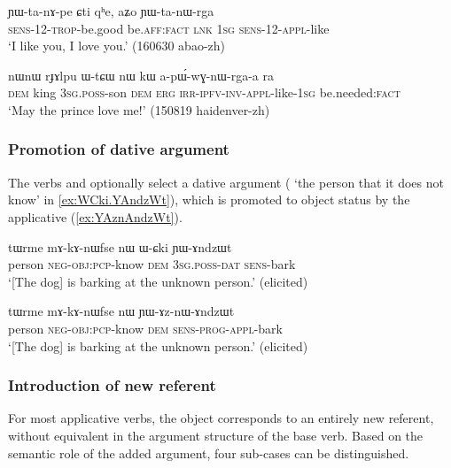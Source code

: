 \begin{exe}
\ex \label{ex:YWtanWrga}
\gll ɲɯ-ta-nɤ-pe ɕti qʰe, aʑo ɲɯ-ta-nɯ-rga \\
\textsc{sens}-1\fl{}2-\textsc{trop}-be.good be.\textsc{aff}:\textsc{fact} \textsc{lnk} \textsc{1sg} \textsc{sens}-1\fl{}2-\textsc{appl}-like \\
\glt `I like you, I love you.' (160630 abao-zh)
\end{exe}

\begin{exe}
\ex \label{ex:apWwGnWrgaa}
\gll nɯnɯ rɟɤlpu ɯ-tɕɯ nɯ kɯ a-pɯ́-wɣ-nɯ-rga-a ra \\
\textsc{dem} king \textsc{3sg}.\textsc{poss}-son \textsc{dem} \textsc{erg} \textsc{irr}-\textsc{ipfv}-\textsc{inv}-\textsc{appl}-like-\textsc{1sg} be.needed:\textsc{fact} \\
\glt `May the prince love me!' (150819 haidenver-zh)
\end{exe}

\subsubsection{Promotion of dative argument} \label{sec:applicative.dative}
The verbs  and  optionally select a dative argument ( `the person that it does not know' in \ref{ex:WCki.YAndzWt}), which is promoted to object status by the applicative (\ref{ex:YAznAndzWt}).

\begin{exe}
\ex \label{ex:WCki.YAndzWt}
\gll tɯrme mɤ-kɤ-nɯfse nɯ ɯ-ɕki ɲɯ-ɤndzɯt \\
person \textsc{neg}-\textsc{obj}:\textsc{pcp}-know \textsc{dem} \textsc{3sg}.\textsc{poss}-\textsc{dat} \textsc{sens}-bark \\
\glt `[The dog] is barking at the unknown person.' (elicited)
\end{exe}

\begin{exe}
\ex \label{ex:YAznAndzWt}
\gll tɯrme mɤ-kɤ-nɯfse nɯ ɲɯ-ɤz-nɯ-ɤndzɯt \\
person \textsc{neg}-\textsc{obj}:\textsc{pcp}-know \textsc{dem} \textsc{sens}-\textsc{prog}-\textsc{appl}-bark \\
\glt `[The dog] is barking at the unknown person.' (elicited)
\end{exe}

\subsubsection{Introduction of new referent}
For most applicative verbs, the object corresponds to an entirely new referent, without equivalent in the argument structure of the base verb. Based on the semantic role of the added argument, four sub-cases can be distinguished.

